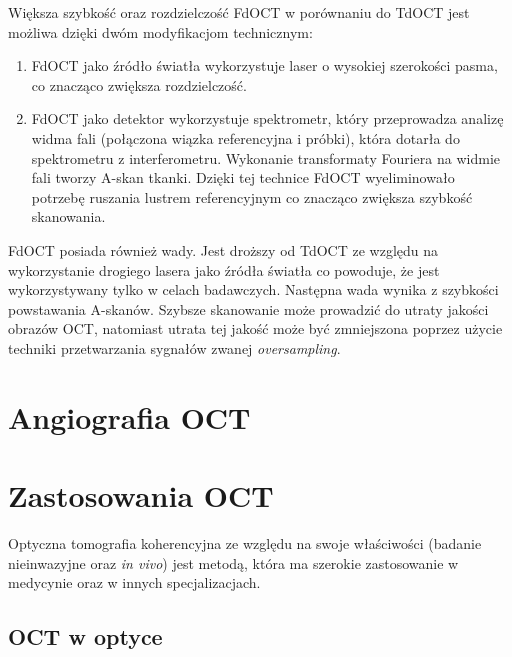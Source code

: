Większa szybkość oraz rozdzielczość FdOCT w porównaniu do TdOCT jest możliwa dzięki dwóm modyfikacjom technicznym:

\begin{enumerate}

\item FdOCT jako źródło światła wykorzystuje laser o wysokiej szerokości pasma, co znacząco zwiększa rozdzielczość.
\item FdOCT jako detektor wykorzystuje spektrometr, który przeprowadza analizę widma fali (połączona wiązka referencyjna i próbki), która dotarła do spektrometru z interferometru. Wykonanie transformaty Fouriera na widmie fali tworzy A-skan tkanki. Dzięki tej technice FdOCT wyeliminowało potrzebę ruszania lustrem referencyjnym co znacząco zwiększa szybkość skanowania.

\end{enumerate}

FdOCT posiada również wady. Jest droższy od TdOCT ze względu na wykorzystanie drogiego lasera jako źródła światła co powoduje, że jest wykorzystywany tylko w celach badawczych. Następna wada wynika z szybkości powstawania A-skanów. Szybsze skanowanie może prowadzić do utraty jakości obrazów OCT, natomiast utrata tej jakość może być zmniejszona poprzez użycie techniki przetwarzania sygnałów zwanej \textit{oversampling}.


\section{Angiografia OCT}
\label{sec:obrazowanie_oct:angiografia_oct}


\section{Zastosowania OCT}
\label{sec:obrazowanie_oct:zastosowania_oct}

Optyczna tomografia koherencyjna ze względu na swoje właściwości (badanie nieinwazyjne oraz \textit{in vivo}) jest metodą, która ma szerokie zastosowanie w medycynie oraz w innych specjalizacjach.

\subsection{OCT w optyce}

